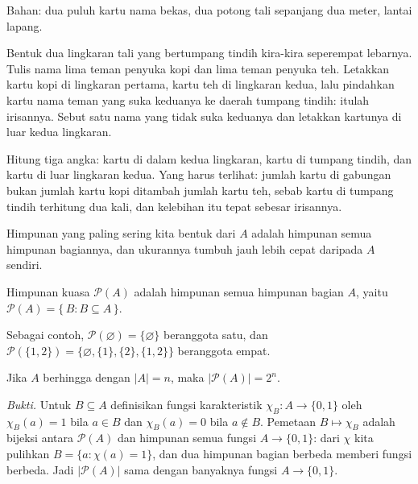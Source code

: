 \begin{tangan}
Bahan: dua puluh kartu nama bekas, dua potong tali sepanjang dua meter, lantai lapang.

Bentuk dua lingkaran tali yang bertumpang tindih kira-kira seperempat lebarnya. Tulis
nama lima teman penyuka kopi dan lima teman penyuka teh. Letakkan kartu kopi di
lingkaran pertama, kartu teh di lingkaran kedua, lalu pindahkan kartu nama teman yang
suka keduanya ke daerah tumpang tindih: itulah irisannya. Sebut satu nama yang tidak
suka keduanya dan letakkan kartunya di luar kedua lingkaran.

Hitung tiga angka: kartu di dalam kedua lingkaran, kartu di tumpang tindih, dan kartu
di luar lingkaran kedua. Yang harus terlihat: jumlah kartu di gabungan bukan jumlah
kartu kopi ditambah jumlah kartu teh, sebab kartu di tumpang tindih terhitung dua
kali, dan kelebihan itu tepat sebesar irisannya.
\end{tangan}

Himpunan yang paling sering kita bentuk dari $A$ adalah himpunan semua himpunan
bagiannya, dan ukurannya tumbuh jauh lebih cepat daripada $A$ sendiri.

\begin{definisi}
Himpunan kuasa $\mathcal{P}(A)$ adalah himpunan semua himpunan bagian $A$, yaitu
$\mathcal{P}(A) = \{\, B : B \subseteq A \,\}$.
\end{definisi}


Sebagai contoh, $\mathcal{P}(\varnothing) = \{\varnothing\}$ beranggota satu, dan
$\mathcal{P}(\{1,2\}) = \{\varnothing, \{1\}, \{2\}, \{1,2\}\}$ beranggota empat.

\begin{proposisi}
Jika $A$ berhingga dengan $|A| = n$, maka $|\mathcal{P}(A)| = 2^{n}$.
\end{proposisi}
\par\smallskip\noindent\textit{Bukti.} Untuk $B \subseteq A$ definisikan fungsi
karakteristik $\chi_B : A \to \{0,1\}$ oleh $\chi_B(a) = 1$ bila $a \in B$ dan
$\chi_B(a) = 0$ bila $a \notin B$. Pemetaan $B \mapsto \chi_B$ adalah bijeksi antara
$\mathcal{P}(A)$ dan himpunan semua fungsi $A \to \{0,1\}$: dari $\chi$ kita pulihkan
$B = \{a : \chi(a) = 1\}$, dan dua himpunan bagian berbeda memberi fungsi berbeda.
Jadi $|\mathcal{P}(A)|$ sama dengan banyaknya fungsi $A \to \{0,1\}$.

